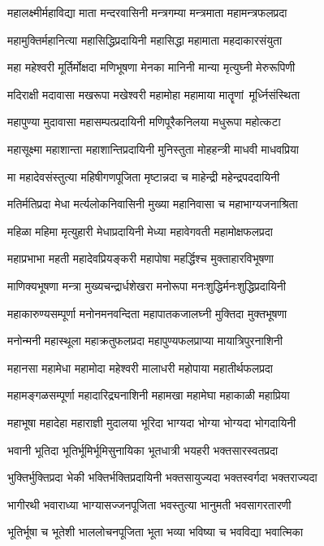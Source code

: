 \twolineshloka
{महालक्ष्मीर्महाविद्या माता मन्दरवासिनी}
{मन्त्रगम्या मन्त्रमाता महामन्त्रफलप्रदा}%

\twolineshloka
{महामुक्तिर्महानित्या महासिद्धिप्रदायिनी}
{महासिद्धा महामाता महदाकारसंयुता}%

\twolineshloka
{महा महेश्वरी मूर्तिर्मोक्षदा मणिभूषणा}
{मेनका मानिनी मान्या मृत्युघ्नी मेरुरूपिणी}%

\twolineshloka
{मदिराक्षी मदावासा मखरूपा मखेश्वरी}
{महामोहा महामाया मातॄणां~मूर्ध्निसंस्थिता}%

\twolineshloka
{महापुण्या मुदावासा महासम्पत्प्रदायिनी}
{मणिपूरैकनिलया मधुरूपा महोत्कटा}%

\twolineshloka
{महासूक्ष्मा महाशान्ता महाशान्तिप्रदायिनी}
{मुनिस्तुता मोहहन्त्री माधवी माधवप्रिया}%

\twolineshloka
{मा महादेवसंस्तुत्या महिषीगणपूजिता}
{मृष्टान्नदा च माहेन्द्री महेन्द्रपददायिनी}%

\twolineshloka
{मतिर्मतिप्रदा मेधा मर्त्यलोकनिवासिनी}
{मुख्या महानिवासा च महाभाग्यजनाश्रिता}%

\twolineshloka
{महिळा महिमा मृत्युहारी मेधाप्रदायिनी}
{मेध्या महावेगवती महामोक्षफलप्रदा}%

\twolineshloka
{महाप्रभाभा महती महादेवप्रियङ्करी}
{महापोषा महर्द्धिश्च मुक्ताहारविभूषणा}%

\twolineshloka
{माणिक्यभूषणा मन्त्रा मुख्यचन्द्रार्धशेखरा}
{मनोरूपा मनःशुद्धिर्मनःशुद्धिप्रदायिनी}%

\twolineshloka
{महाकारुण्यसम्पूर्णा मनोनमनवन्दिता}
{महापातकजालघ्नी मुक्तिदा मुक्तभूषणा}%

\twolineshloka
{मनोन्मनी महास्थूला महाक्रतुफलप्रदा}
{महापुण्यफलप्राप्या मायात्रिपुरनाशिनी}%

\twolineshloka
{महानसा महामेधा महामोदा महेश्वरी}
{मालाधरी महोपाया महातीर्थफलप्रदा}%

\twolineshloka
{महामङ्गळसम्पूर्णा महादारिद्र्यनाशिनी}
{महामखा महामेघा महाकाळी महाप्रिया}%

\twolineshloka
{महाभूषा महादेहा महाराज्ञी मुदालया}
{भूरिदा भाग्यदा भोग्या भोग्यदा भोगदायिनी}%

\twolineshloka
{भवानी भूतिदा भूतिर्भूमिर्भूमिसुनायिका}
{भूतधात्री भयहरी भक्तसारस्वतप्रदा}%

\twolineshloka
{भुक्तिर्भुक्तिप्रदा भेकी भक्तिर्भक्तिप्रदायिनी}
{भक्तसायुज्यदा भक्तस्वर्गदा भक्तराज्यदा}%

\twolineshloka
{भागीरथी भवाराध्या भाग्यासज्जनपूजिता}
{भवस्तुत्या भानुमती भवसागरतारणी}%

\twolineshloka
{भूतिर्भूषा च भूतेशी भाललोचनपूजिता}
{भूता भव्या भविष्या च भवविद्या भवात्मिका}%

